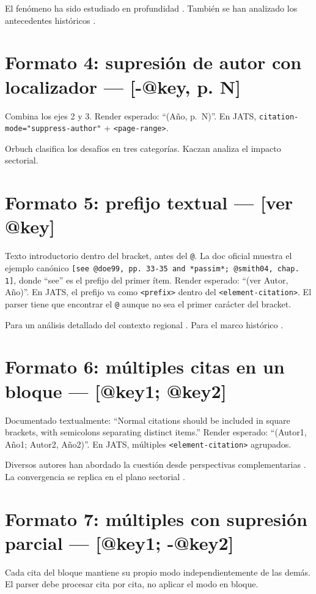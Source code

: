El fenómeno ha sido estudiado en profundidad \autocite[p. 5]{2961-KACZAN2016}. También se han analizado los antecedentes históricos \autocite[pp. 55-60]{3041-PINEAU1999}.


\section{Formato 4: supresión de autor con localizador — [-@key, p. N]}
Combina los ejes 2 y 3. Render esperado: “(Año, p. N)”. En JATS, \texttt{citation-mode="suppress-author"} + \texttt{<page-range>}.

Orbuch \autocite*[p. 235]{3036-ORBUCH2020} clasifica los desafíos en tres categorías. Kaczan \autocite*[pp. 225-230]{2961-KACZAN2016} analiza el impacto sectorial.


\section{Formato 5: prefijo textual — [ver @key]}
Texto introductorio dentro del bracket, antes del \texttt{@}. La doc oficial muestra el ejemplo canónico \texttt{[see @doe99, pp. 33-35 and *passim*; @smith04, chap. 1]}, donde “see” es el prefijo del primer ítem. Render esperado: “(ver Autor, Año)”. En JATS, el prefijo va como \texttt{<prefix>} dentro del \texttt{<element-citation>}. El parser tiene que encontrar el \texttt{@} aunque no sea el primer carácter del bracket.

Para un análisis detallado del contexto regional \autocite[ver][]{3036-ORBUCH2020}. Para el marco histórico \autocite[cf.][]{3041-PINEAU1999}.


\section{Formato 6: múltiples citas en un bloque — [@key1; @key2]}
Documentado textualmente: “Normal citations should be included in square brackets, with semicolons separating distinct items.” Render esperado: “(Autor1, Año1; Autor2, Año2)”. En JATS, múltiples \texttt{<element-citation>} agrupados.

Diversos autores han abordado la cuestión desde perspectivas complementarias \autocite{2961-KACZAN2016,3041-PINEAU1999}. La convergencia se replica en el plano sectorial \autocite{3036-ORBUCH2020,2961-KACZAN2016}.


\section{Formato 7: múltiples con supresión parcial — [@key1; -@key2]}
Cada cita del bloque mantiene su propio modo independientemente de las demás. El parser debe procesar cita por cita, no aplicar el modo en bloque.

